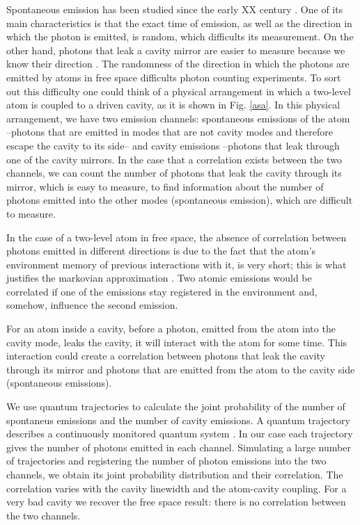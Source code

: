 \documentclass[%
 reprint,
 amsmath,amssymb,
 aps, 
]{revtex4-1}
\begin{document}
Spontaneous emission has been studied since the early XX century
\cite{10.2307/94746, 1917PhyZ...18..121E}. One of its main
characteristics is that the exact time of emission, as well as the
direction in which the photon is emitted, is random, which difficults
its measurement. On the other hand, photons that leak a cavity mirror
are easier to measure because we know their direction \cite{326305,
  doi:10.1063/1.113345}. The randomness of the direction in which the
photons are emitted by atoms in free space difficults photon counting
experiments. To sort out this difficulty one could think of a physical
arrangement in which a two-level atom is coupled to a driven cavity,
as it is shown in Fig. \ref{asa}. In this physical arrangement, we
have two emission channels: spontaneous emissions of the atom
--photons that are emitted in modes that are not cavity modes and
therefore escape the cavity to its side-- and cavity emissions
--photons that leak through one of the cavity mirrors. In the case
that a correlation exists between the two channels, we can count the
number of photons that leak the cavity through its mirror, which is
easy to measure, to find information about the number of photons
emitted into the other modes (spontaneous emission), which are
difficult to measure.

In the case of a two-level atom in free space, the absence of
correlation between photons emitted in different directions is due to
the fact that the atom's environment memory of previous interactions
with it, is very short; this is what justifies the markovian
approximation \cite{daley2014quantum}. Two atomic emissions would be
correlated if one of the emissions stay registered in the environment
and, somehow, influence the second emission.

For an atom inside a cavity, before a photon, emitted from the atom
into the cavity mode, leaks the cavity, it will interact with the atom
for some time. This interaction could create a correlation between
photons that leak the cavity through its mirror and photons that are
emitted from the atom to the cavity side (spontaneous emissions).

We use quantum trajectories to calculate the joint probability of the
number of spontaneus emissions and the number of cavity emissions. A
quantum trajectory describes a continuously monitored quantum system
\cite{Carmichael1993Open}. In our case each trajectory gives the
number of photons emitted in each channel. Simulating a large number
of trajectories and registering the number of photon emissions into
the two channels, we obtain its joint probability distribution and
their correlation. The correlation varies with the cavity linewidth
and the atom-cavity coupling. For a very bad cavity we recover the
free space result: there is no correlation between the two channels.
\end{document}
